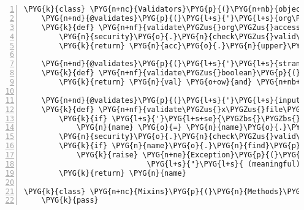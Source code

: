 \begin{Verbatim}[commandchars=\\\{\},numbers=left,firstnumber=1,stepnumber=5]
\PYG{k}{class} \PYG{n+nc}{Validators}\PYG{p}{(}\PYG{n+nb}{object}\PYG{p}{)}\PYG{p}{:}
    \PYG{n+nd}{@validates}\PYG{p}{(}\PYG{l+s}{'}\PYG{l+s}{org\PYGZus{}accession}\PYG{l+s}{'}\PYG{p}{)}
    \PYG{k}{def} \PYG{n+nf}{validate\PYGZus{}org\PYGZus{}accession}\PYG{p}{(}\PYG{n+nb+bp}{self}\PYG{p}{,} \PYG{n}{attr}\PYG{p}{,} \PYG{n}{acc}\PYG{p}{)}\PYG{p}{:}
        \PYG{n}{security}\PYG{o}{.}\PYG{n}{check\PYGZus{}valid\PYGZus{}filename}\PYG{p}{(}\PYG{n}{acc}\PYG{p}{)}
        \PYG{k}{return} \PYG{n}{acc}\PYG{o}{.}\PYG{n}{upper}\PYG{p}{(}\PYG{p}{)}

    \PYG{n+nd}{@validates}\PYG{p}{(}\PYG{l+s}{'}\PYG{l+s}{strandspecific}\PYG{l+s}{'}\PYG{p}{,} \PYG{l+s}{'}\PYG{l+s}{pairended}\PYG{l+s}{'}\PYG{p}{)}
    \PYG{k}{def} \PYG{n+nf}{validate\PYGZus{}boolean}\PYG{p}{(}\PYG{n+nb+bp}{self}\PYG{p}{,} \PYG{n}{attr}\PYG{p}{,} \PYG{n}{val}\PYG{p}{)}\PYG{p}{:}
        \PYG{k}{return} \PYG{n}{val} \PYG{o+ow}{and} \PYG{n+nb+bp}{True} \PYG{o+ow}{or} \PYG{n+nb+bp}{False}

    \PYG{n+nd}{@validates}\PYG{p}{(}\PYG{l+s}{'}\PYG{l+s}{inputfile\PYGZus{}name}\PYG{l+s}{'}\PYG{p}{,} \PYG{l+s}{'}\PYG{l+s}{genbankfile\PYGZus{}name}\PYG{l+s}{'}\PYG{p}{)}
    \PYG{k}{def} \PYG{n+nf}{validate\PYGZus{}x\PYGZus{}file\PYGZus{}name}\PYG{p}{(}\PYG{n+nb+bp}{self}\PYG{p}{,} \PYG{n}{attr}\PYG{p}{,} \PYG{n}{name}\PYG{p}{)}\PYG{p}{:}
        \PYG{k}{if} \PYG{l+s}{'}\PYG{l+s+se}{\PYGZbs{}\PYGZbs{}}\PYG{l+s}{'} \PYG{o+ow}{in} \PYG{n}{name}\PYG{p}{:}
            \PYG{n}{name} \PYG{o}{=} \PYG{n}{name}\PYG{o}{.}\PYG{n}{rsplit}\PYG{p}{(}\PYG{l+s}{'}\PYG{l+s+se}{\PYGZbs{}\PYGZbs{}}\PYG{l+s}{'}\PYG{p}{,} \PYG{l+m+mi}{1}\PYG{p}{)}\PYG{p}{[}\PYG{l+m+mi}{1}\PYG{p}{]}
        \PYG{n}{security}\PYG{o}{.}\PYG{n}{check\PYGZus{}valid\PYGZus{}filename}\PYG{p}{(}\PYG{n}{name}\PYG{p}{)}
        \PYG{k}{if} \PYG{n}{name}\PYG{o}{.}\PYG{n}{find}\PYG{p}{(}\PYG{l+s}{'}\PYG{l+s}{.}\PYG{l+s}{'}\PYG{p}{)} \PYG{o}{\textless{}} \PYG{l+m+mi}{0}\PYG{p}{:}
            \PYG{k}{raise} \PYG{n+ne}{Exception}\PYG{p}{(}\PYG{l+s}{"}\PYG{l+s}{Please make sure your input file has a}\PYG{l+s}{"}
                            \PYG{l+s}{"}\PYG{l+s}{ (meaningful) extension, like .fastq or .sra}\PYG{l+s}{"}\PYG{p}{)}
        \PYG{k}{return} \PYG{n}{name}

\PYG{k}{class} \PYG{n+nc}{Mixins}\PYG{p}{(}\PYG{n}{Methods}\PYG{p}{,} \PYG{n}{Properties}\PYG{p}{,} \PYG{n}{Validators}\PYG{p}{)}\PYG{p}{:}
    \PYG{k}{pass}
\end{Verbatim}


